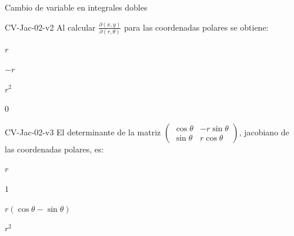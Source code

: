 \documentclass[a4,11pt]{aleph-notas}
\begin{document}
\begin{quiz}{Cambio de variable en integrales dobles}
\begin{multi}[]%
    {CV-Jac-02-v2}
    Al calcular $\displaystyle\frac{\partial(x,y)}{\partial(r,\theta)}$ para las coordenadas polares se obtiene:
    \item* $r$
    \item $-r$
    \item $r^2$
    \item $0$
\end{multi}

\begin{multi}[]%
    {CV-Jac-02-v3}
    El determinante de la matriz $\begin{pmatrix} \cos\theta & -r\sin\theta \\ \sin\theta & r\cos\theta \end{pmatrix}$, jacobiano de las coordenadas polares, es:
    \item* $r$
    \item $1$
    \item $r(\cos\theta-\sin\theta)$
    \item $r^2$
\end{multi}

\end{quiz}
\end{document}
